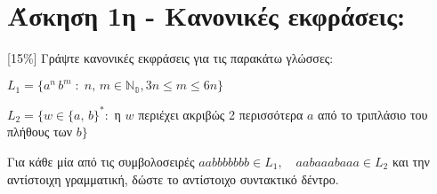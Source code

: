 \section{Άσκηση 1η - Κανονικές εκφράσεις:}
\label{sec:Exercise_1}
\doublespacing

[15\%] Γράψτε κανονικές εκφράσεις για τις παρακάτω γλώσσες:

\bm{\textcolor{blue}{(α)}} $L_1 = \{a^n\,b^m\; : \;n,\,m \in \mathbb{N_0}, 3n \leq m \leq 6n\}$

\bm{\textcolor{blue}{(β)}} $L_2 = \{w \in \{a,\,b\}^* :$ η $w$ περιέχει ακριβώς 2 περισσότερα $a$ από το τριπλάσιο
του πλήθους των $b\}$

Για κάθε μία από τις συμβολοσειρές $aabbbbbbb \in L_1,\quad aabaaabaaa \in L_2$ και την αντίστοιχη γραμματική,
δώστε το αντίστοιχο συντακτικό δέντρο.
\clearpage